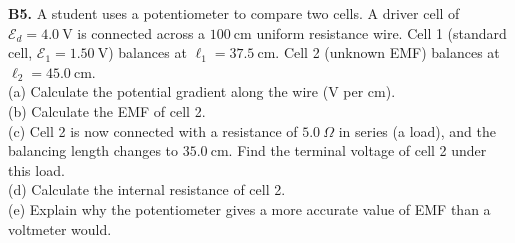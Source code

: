 \begin{exercisebox}[23]
\vspace{0.4cm}

\textbf{B5.} A student uses a potentiometer to
compare two cells. A driver cell of
$\mathcal{E}_d = 4.0\ \text{V}$ is connected across
a $100\ \text{cm}$ uniform resistance wire.
Cell 1 (standard cell, $\mathcal{E}_1 = 1.50\ \text{V}$)
balances at $\ell_1 = 37.5\ \text{cm}$.
Cell 2 (unknown EMF) balances at
$\ell_2 = 45.0\ \text{cm}$.\\[4pt]
(a) Calculate the potential gradient along the wire
(V per cm).\\
(b) Calculate the EMF of cell 2.\\
(c) Cell 2 is now connected with a resistance of
$5.0\ \Omega$ in series (a load), and the balancing
length changes to $35.0\ \text{cm}$.
Find the terminal voltage of cell 2 under this load.\\
(d) Calculate the internal resistance of cell 2.\\
(e) Explain why the potentiometer gives a more
accurate value of EMF than a voltmeter would.
\hfill{}


\end{exercisebox}

